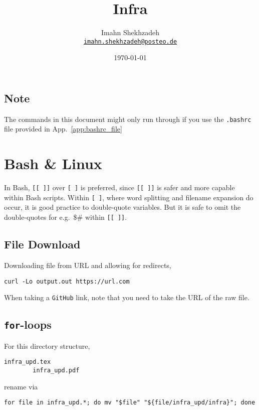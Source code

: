 \documentclass[12pt, a4paper]{scrbook}
\title{Infra}
\author{Imahn Shekhzadeh \\ \texttt{\href{mailto:email@example.com}{imahn.shekhzadeh@posteo.de}}\normalsize}
\date{\today}
\numberwithin{equation}{section}
\theoremstyle{definition}
\theoremstyle{definition}
\begin{document}
	\maketitle 
	\tableofcontents
	
	\section*{\large Note}
	
	The commands in this document might only run through if you use the \texttt{.bashrc} file provided in App.~\ref{app:bashrc_file}	
	
	\chapter{Bash \& Linux}
	
	In Bash, \texttt{[[ ]]} over \texttt{[ ]} is preferred, since \texttt{[[ ]]} is safer and more capable within Bash scripts. 
	Within \texttt{[ ]}, where word splitting and filename expansion do occur, it is good practice to double-quote variables. 
	But it is safe to omit the double-quotes for e.g.~\$\# within \texttt{[[ ]]}.
	
	\section{File Download}	

	Downloading file from URL and allowing for redirects, 
	
	\begin{lstlisting}[style=mystylebash, label=alg:curl, xleftmargin=\parindent]
		curl -Lo output.out https://url.com
	\end{lstlisting}
	
	When taking a \texttt{GitHub} link, note that you need to take the URL of the raw file.

	\section{\texttt{for}-loops}
	
	For this directory structure, 
	
	\begin{lstlisting}[style=mystylebash, label=alg:exmp__dir_struc, xleftmargin=\parindent]
		infra_upd.tex
		infra_upd.pdf
	\end{lstlisting} 
	
	rename via
	
	\begin{lstlisting}[style=mystylebash, label=alg:linux_mv_files_for, xleftmargin=\parindent]
		for file in infra_upd.*; do mv "$file" "${file/infra_upd/infra}"; done
	\end{lstlisting}
	
\end{document}
